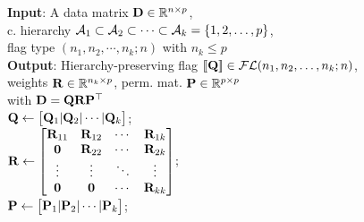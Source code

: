 \begin{algorithm}[ht!]%
\caption{\algname}\label{alg:FD}
 \textbf{Input}: {A data matrix $\mathbf{D} \in \mathbb{R}^{n \times p}$, \\
 c. hierarchy $\mathcal{A}_1\subset \mathcal{A}_2 \subset \cdots \subset \mathcal{A}_k = \{1,2,\dots,p\}$, \\
 flag type $(n_1,n_2,\cdots,n_k;n)$ with $n_k \leq p$}\\
 \textbf{Output}: {Hierarchy-preserving flag $[\![\mathbf{Q}]\!] \in \mathcal{FL}(n_1,n_2,\dots,n_k;n)$, \\
 weights $\mathbf{R} \in \mathbb{R}^{n_k \times p}$, perm. mat. $\mathbf{P} \in \mathbb{R}^{p \times p}$} \\
 with $\mathbf{D} = \mathbf{Q} \mathbf{R} \mathbf{P}^\top$\\[0.25em]
     $\mathbf{Q} \gets \begin{bmatrix}\mathbf{Q}_1 | \mathbf{Q}_2 | \cdots | \mathbf{Q}_k\end{bmatrix}$;\\
     $\mathbf{R} \gets \begin{bmatrix}
            \mathbf{R}_{11} & \mathbf{R}_{12} & \cdots & \mathbf{R}_{1k}\\
            \mathbf{0} & \mathbf{R}_{22} & \cdots & \mathbf{R}_{2k}\\
            \vdots & \vdots & \ddots & \vdots\\
            \mathbf{0} & \mathbf{0} & \cdots & \mathbf{R}_{kk} \end{bmatrix}$;\\
     $\mathbf{P} \gets \begin{bmatrix} \mathbf{P}_1 | \mathbf{P}_2 | \cdots | \mathbf{P}_k \end{bmatrix}$;
\end{algorithm}%
